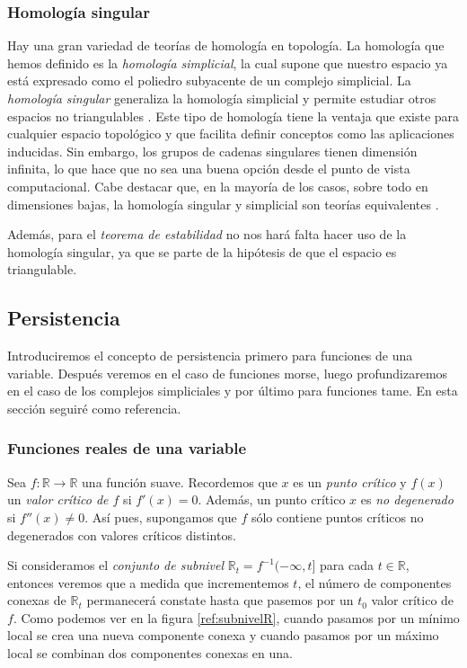 \subsubsection*{Homología singular}
Hay una gran variedad de teorías de homología en topología. La homología que hemos definido es la \emph{homología simplicial}, la cual supone que nuestro espacio ya está expresado como el poliedro subyacente de un complejo simplicial. La \emph{homología singular} generaliza la homología simplicial y permite estudiar otros espacios no triangulables \cite{Crossley_2005}. Este tipo de homología tiene la ventaja que existe para cualquier espacio topológico y que facilita definir conceptos como las aplicaciones inducidas. Sin embargo, los grupos de cadenas singulares tienen dimensión infinita, lo que hace que no sea una buena opción desde el punto de vista computacional. Cabe destacar que, en la mayoría de los casos, sobre todo en dimensiones bajas, la homología singular y simplicial son teorías equivalentes \cite{articuloPersistenciaEH}.

Además, para el \textit{teorema de estabilidad} no nos hará falta hacer uso de la homología singular, ya que se parte de la hipótesis de que el espacio es triangulable.

\subsection{Persistencia}
Introduciremos el concepto de persistencia primero para funciones de una variable. Después veremos en el caso de funciones morse, luego profundizaremos en el caso de los complejos simpliciales y por último para funciones tame. En esta sección seguiré \cite{articuloPersistenciaEH} como referencia.

\subsubsection*{Funciones reales de una variable}
Sea $f: \mathbb{R} \to \mathbb{R}$ una función suave. Recordemos que $x$ es un \emph{punto crítico} y $f(x)$ un \emph{valor crítico de $f$} si $f'(x)=0$. Además, un punto crítico $x$ es \emph{no degenerado} si $f''(x) \neq 0$. Así pues, supongamos que $f$ sólo contiene puntos críticos no degenerados con valores críticos distintos.

Si consideramos el \emph{conjunto de subnivel} $\mathbb{R}_t=f^{-1}(-\infty, t]$ para cada $t \in \mathbb{R}$, entonces veremos que a medida que incrementemos $t$, el número de componentes conexas de $\mathbb{R}_t$ permanecerá constate hasta que pasemos por un $t_0$ valor crítico de $f$. Como podemos ver en la figura \ref{ref:subnivelR}, cuando pasamos por un mínimo local se crea una nueva componente conexa y cuando pasamos por un máximo local se combinan dos componentes conexas en una.

